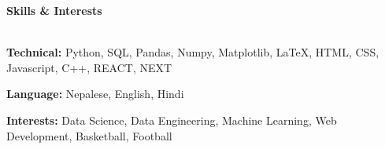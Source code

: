 \documentclass[11pt]{article}
\begin{document}
\begin{center}
    {\Huge\textbf{Skills \& Interests}}
\end{center}
\vspace{-15pt}

\hrulefill \\
{\large\textbf{Technical:}} Python, SQL, Pandas, Numpy, Matplotlib, LaTeX, HTML, CSS, Javascript, C++, REACT, NEXT

{\large\textbf{Language:}} Nepalese, English, Hindi 

{\large\textbf{Interests:}} Data Science, Data Engineering, Machine Learning, Web Development, Basketball, Football
\end{document}
